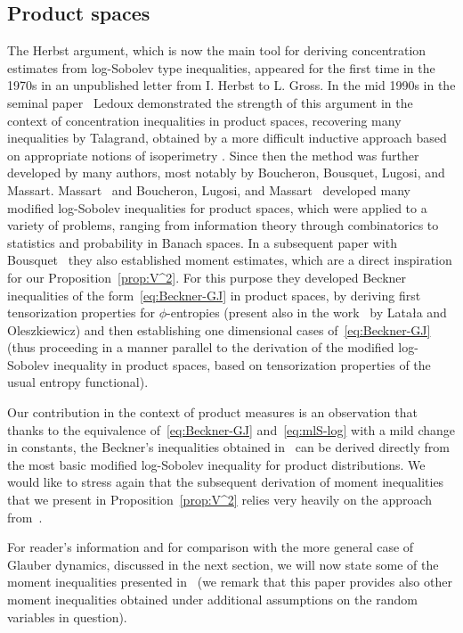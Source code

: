 \documentclass[a4paper]{amsart}
\theoremstyle{definition}
\theoremstyle{remark}
\numberwithin{equation}{section}
\begin{document}
\subsection{Product spaces} \label{sec:product-spaces}

The Herbst argument, which is now the main tool for deriving concentration estimates from log-Sobolev type inequalities, appeared for the first time in the 1970s in an unpublished letter from I. Herbst to L. Gross. In the mid 1990s in the seminal  paper~\cite{MR1399224} Ledoux demonstrated the strength of this argument in the context of concentration inequalities in product spaces, recovering many inequalities by Talagrand, obtained by a more difficult inductive approach based on appropriate notions of isoperimetry \cite{MR1419006,MR1361756}. Since then the method was further developed by many authors, most notably by Boucheron, Bousquet, Lugosi, and Massart.
 Massart~\cite{MR1782276} and  Boucheron, Lugosi, and Massart~\cite{MR1749290,MR1989444} developed many modified log-Sobolev inequalities for product spaces, which were applied to a variety of problems, ranging from information theory through combinatorics to statistics and probability in Banach spaces. In a subsequent paper with Bousquet~\cite{MR2123200} they also established moment estimates, which are a direct inspiration for our Proposition~\ref{prop:V^2}. For this purpose they developed  Beckner inequalities of the form~\eqref{eq:Beckner-GJ} in product spaces, by deriving first tensorization properties for $\phi$-entropies (present also in the work~\cite{MR1796718} by Lata{\l}a and Oleszkiewicz) and then establishing one dimensional cases of~\eqref{eq:Beckner-GJ} (thus proceeding in a manner parallel to the derivation of the modified log-Sobolev inequality in product spaces, based on tensorization properties of the usual entropy functional). 
 
Our contribution in the context of product measures is an observation that thanks to the equivalence of~\eqref{eq:Beckner-GJ} and~\eqref{eq:mlS-log} with a mild change in constants, the Beckner's inequalities obtained in~\cite{MR2123200} can be derived directly from the most basic modified log-Sobolev inequality for product distributions. We would like to stress again that the subsequent derivation of moment inequalities that we present in Proposition~\ref{prop:V^2} relies very heavily on the approach from~\cite{MR2123200}.


For reader's information and for comparison with the more general case of Glauber dynamics, discussed in the next section, we will now state some of the  moment inequalities presented in~\cite{MR2123200} (we remark that this paper provides also other moment inequalities obtained under additional assumptions on the random variables in question).
\end{document}
